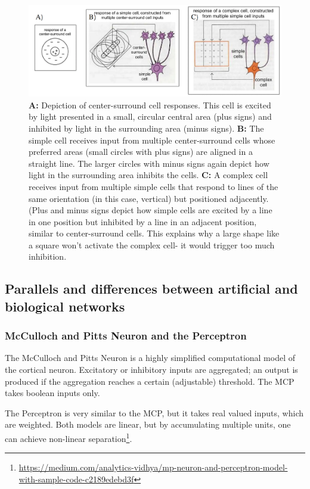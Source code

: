 \documentclass[main]{subfiles}
\begin{document}
\begin{figure}[H]
    \centering
    \includegraphics[width=0.9\linewidth]{01_Introduction/figures/hubelwieselresults.png}
    \caption{\textbf{A:} Depiction of center-surround cell responses. This cell is excited by light presented in a small, circular central area (plus signs) and inhibited by light in the surrounding area (minus signs). \textbf{B:} The simple cell receives input from multiple center-surround cells whose preferred areas (small circles with plus signs) are aligned in a straight line. The larger circles with minus signs again depict how light in the surrounding area inhibits the cells. \textbf{C:} A complex cell receives input from multiple simple cells that respond to lines of the same orientation (in this case, vertical) but positioned adjacently. (Plus and minus signs depict how simple cells are excited by a line in one position but inhibited by a line in an adjacent position, similar to center-surround cells. This explains why a large shape like a square won’t activate the complex cell- it would trigger too much inhibition.}
    \label{fig:basalandcerebellum}
\end{figure}

\subsection{Parallels and differences between artificial and biological networks}
\subsubsection{McCulloch and Pitts Neuron and the Perceptron}
The McCulloch and Pitts Neuron is a highly simplified computational model of the cortical neuron. Excitatory or inhibitory inputs are aggregated; an output is produced if the aggregation reaches a certain (adjustable) threshold. The MCP takes boolean inputs only. 

The Perceptron is very similar to the MCP, but it takes real valued inputs, which are weighted. Both models are linear, but by accumulating multiple units, one can achieve non-linear separation\footnote{\url{https://medium.com/analytics-vidhya/mp-neuron-and-perceptron-model-with-sample-code-c2189edebd3f}}. 
\end{document}

